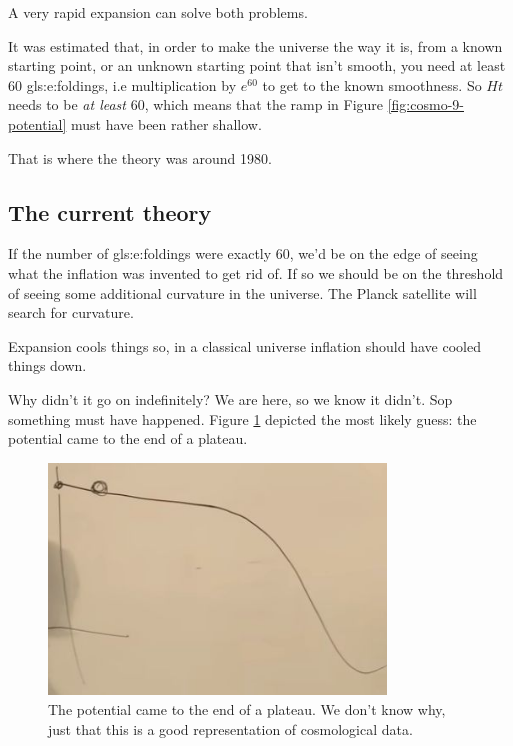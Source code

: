 \documentclass[]{article}
\begin{document}
 A very rapid expansion can solve both problems.
 
 It was estimated that, in order to make the universe the way it is, from a known starting point, or an unknown starting point that isn't smooth, you need at least 60 \glspl{gls:e:folding}, i.e multiplication by $e^{60}$ to get to the known smoothness. So $Ht$ needs to be \emph{at least} 60, which means that the ramp in Figure \ref{fig:cosmo-9-potential} must have been rather shallow.
 
 That is where the theory was around 1980.
 
 \subsection{The current theory}
 
 If the number of \glspl{gls:e:folding} were exactly 60, we'd be on the edge of seeing what the inflation was invented to get rid of. If so we should be on the threshold of seeing some additional curvature in the universe. The Planck satellite will search for curvature.
 
 Expansion cools things so, in a classical universe inflation should have cooled things down.
 
 Why didn't it go on indefinitely? We are here, so we know it didn't. Sop something must have happened. Figure \ref{fig:cosmo-9-something-happened} depicted the most likely guess: the potential came to the end of a plateau.
 
 \begin{figure}[H]
 	\caption[The potential came to the end of a plateau]{The potential came to the end of a plateau. We don't know why, just that this is a good representation of cosmological data.}\label{fig:cosmo-9-something-happened}
 	\includegraphics[width=0.8\textwidth]{cosmo-9-something-happened}
 \end{figure}
 
\end{document}
